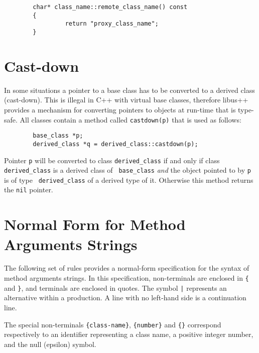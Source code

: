 \begin{verbatim}
        char* class_name::remote_class_name() const
        {
                 return "proxy_class_name";
        }
\end{verbatim}

\section{Cast-down}

In some situations a pointer to a base class has to be converted
to a derived class (cast-down). This is illegal in C++ with virtual
base classes, therefore libus++ provides a mechanism for converting
pointers to objects at run-time that is type-safe. All classes contain
a method called {\tt castdown(p)} that is used as follows:

\begin{verbatim}
        base_class *p;
        derived_class *q = derived_class::castdown(p);
\end{verbatim}

Pointer {\tt p} will be converted to class {\tt derived\_class} if and
only if class {\tt derived\_class} is a derived class of {\tt
base\_class} {\em and} the object pointed to by {\tt p} is of type {\tt
derived\_class} of a derived type of it. Otherwise this method returns
the {\tt nil} pointer.


\appendix

\section{Normal Form for Method Arguments Strings}

The following set of rules provides a normal-form specification for
the syntax of method arguments strings. In this specification,
non-terminals are enclosed in \verb|{| and \verb|}|, and terminals are
enclosed in quotes.  The symbol \verb/|/ represents an alternative
within a production. A line with no left-hand side is a continuation
line.

The special non-terminals \verb|{class-name}|, \verb|{number}| and
\verb|{}| correspond respectively to an identifier representing a
class name, a positive integer number, and the null (epsilon) symbol.

